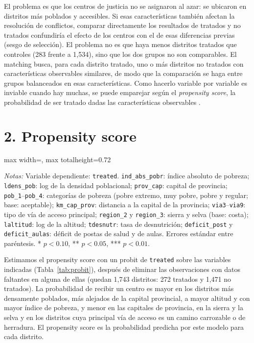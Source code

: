 \documentclass[11pt,a4paper]{article}
\newcommand{\tabla}[1]{\begin{adjustbox}{max width=\linewidth, max totalheight=0.72\textheight}\end{adjustbox}}
\newcommand{\notas}[1]{\par\vspace{0.3em}\begin{minipage}{0.92\linewidth}\footnotesize\textit{Notas:} #1\end{minipage}}
\begin{document}
El problema es que los centros de justicia no se asignaron al azar: se ubicaron en distritos más poblados y accesibles. Si esas características también afectan la resolución de conflictos, comparar directamente los resultados de tratados y no tratados confundiría el efecto de los centros con el de esas diferencias previas (sesgo de selección). El problema no es que haya menos distritos tratados que controles (283 frente a 1,534), sino que los dos grupos no son comparables. El matching busca, para cada distrito tratado, uno o más distritos no tratados con características observables similares, de modo que la comparación se haga entre grupos balanceados en esas características. Como hacerlo variable por variable es inviable cuando hay muchas, se puede emparejar según el \textit{propensity score}, la probabilidad de ser tratado dadas las características observables \citep{rr}.

\section*{2. Propensity score}

\begin{table}[H]\centering
\caption{Modelo probit para el propensity score}\label{tab:probit}
\scriptsize
\tabla{"../output/Tabla 7.tex"}
\notas{Variable dependiente: \texttt{treated}. \texttt{ind\_abs\_pobr}: índice absoluto de pobreza; \texttt{ldens\_pob}: log de la densidad poblacional; \texttt{prov\_cap}: capital de provincia; \texttt{pob\_1}--\texttt{pob\_4}: categorías de pobreza (pobre extremo, muy pobre, pobre y regular; base: aceptable); \texttt{km\_cap\_prov}: distancia a la capital de la provincia; \texttt{via3}--\texttt{via9}: tipo de vía de acceso principal; \texttt{region\_2} y \texttt{region\_3}: sierra y selva (base: costa); \texttt{laltitud}: log de la altitud; \texttt{tdesnutr}: tasa de desnutrición; \texttt{deficit\_post} y \texttt{deficit\_aulas}: déficit de postas de salud y de aulas. Errores estándar entre paréntesis. * $p<0.10$, ** $p<0.05$, *** $p<0.01$.}
\end{table}

Estimamos el propensity score con un probit de \texttt{treated} sobre las variables indicadas (Tabla~\ref{tab:probit}), después de eliminar las observaciones con datos faltantes en alguna de ellas (quedan 1,743 distritos: 272 tratados y 1,471 no tratados). La probabilidad de recibir un centro es mayor en los distritos más densamente poblados, más alejados de la capital provincial, a mayor altitud y con mayor índice de pobreza, y menor en las capitales de provincia, en la sierra y la selva y en los distritos cuya principal vía de acceso es un camino carrozable o de herradura. El propensity score es la probabilidad predicha por este modelo para cada distrito.
\end{document}
